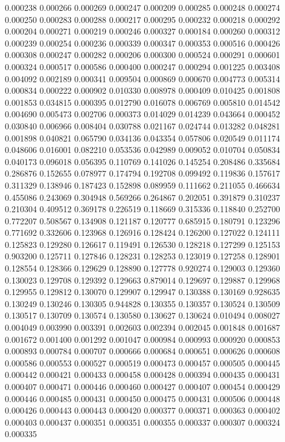 0.000238
0.000266
0.000269
0.000247
0.000209
0.000285
0.000248
0.000274
0.000250
0.000283
0.000288
0.000217
0.000295
0.000232
0.000218
0.000292
0.000204
0.000271
0.000219
0.000246
0.000327
0.000184
0.000260
0.000312
0.000239
0.000254
0.000236
0.000339
0.000347
0.000353
0.000516
0.000426
0.000308
0.000247
0.000282
0.000206
0.000300
0.000524
0.000291
0.000601
0.000324
0.000517
0.000586
0.000400
0.000247
0.000294
0.001225
0.003408
0.004092
0.002189
0.000341
0.009504
0.000869
0.000670
0.004773
0.005314
0.000834
0.000222
0.000902
0.010330
0.008978
0.000409
0.010425
0.001808
0.001853
0.034815
0.000395
0.012790
0.016078
0.006769
0.005810
0.014542
0.004690
0.005473
0.002706
0.000373
0.014029
0.014239
0.043664
0.000452
0.030840
0.006966
0.008404
0.030788
0.021167
0.024744
0.013282
0.048281
0.001898
0.040821
0.065790
0.034136
0.043354
0.057806
0.020549
0.011174
0.048606
0.016001
0.082210
0.053536
0.042989
0.009052
0.010704
0.050834
0.040173
0.096018
0.056395
0.110769
0.141026
0.145254
0.208486
0.335684
0.286876
0.152655
0.078977
0.174794
0.192708
0.099492
0.119836
0.157617
0.311329
0.138946
0.187423
0.152898
0.089959
0.111662
0.211055
0.466634
0.455086
0.243069
0.304948
0.569266
0.264867
0.202051
0.391879
0.310237
0.210304
0.409512
0.369178
0.226519
0.118669
0.315336
0.118840
0.252700
0.772207
0.508567
0.134908
0.121187
0.120777
0.685915
0.180791
0.123296
0.771692
0.332606
0.123968
0.126916
0.128424
0.126200
0.127022
0.124111
0.125823
0.129280
0.126617
0.119491
0.126530
0.128218
0.127299
0.125153
0.903200
0.125711
0.127846
0.128231
0.128253
0.123019
0.127258
0.128901
0.128554
0.128366
0.129629
0.128890
0.127778
0.920274
0.129003
0.129360
0.130023
0.129708
0.129392
0.129663
0.879014
0.129697
0.129887
0.129968
0.129955
0.129812
0.130070
0.129907
0.129947
0.130388
0.130169
0.928635
0.130249
0.130246
0.130305
0.944828
0.130355
0.130357
0.130524
0.130509
0.130517
0.130709
0.130574
0.130580
0.130627
0.130624
0.010494
0.008027
0.004049
0.003990
0.003391
0.002603
0.002394
0.002045
0.001848
0.001687
0.001672
0.001400
0.001292
0.001047
0.000984
0.000993
0.000920
0.000853
0.000893
0.000784
0.000707
0.000666
0.000684
0.000651
0.000626
0.000608
0.000586
0.000553
0.000527
0.000519
0.000473
0.000457
0.000505
0.000445
0.000442
0.000421
0.000433
0.000458
0.000428
0.000394
0.000435
0.000431
0.000407
0.000471
0.000446
0.000460
0.000427
0.000407
0.000454
0.000429
0.000446
0.000485
0.000431
0.000450
0.000475
0.000431
0.000506
0.000448
0.000426
0.000443
0.000443
0.000420
0.000377
0.000371
0.000363
0.000402
0.000403
0.000437
0.000351
0.000351
0.000355
0.000337
0.000307
0.000324
0.000335
